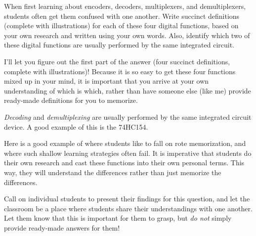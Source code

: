 

When first learning about encoders, decoders, multiplexers, and demultiplexers, students often get them confused with one another.  Write succinct definitions (complete with illustrations) for each of these four digital functions, based on your own research and written using your own words.  Also, identify which two of these digital functions are usually performed by the same integrated circuit.

\vskip 300pt







I'll let you figure out the first part of the answer (four succinct definitions, complete with illustrations)!  Because it is so easy to get these four functions mixed up in your mind, it is important that you arrive at your own understanding of which is which, rather than have someone else (like me) provide ready-made definitions for you to memorize.

\vskip 10pt

{\it Decoding} and {\it demultiplexing} are usually performed by the same integrated circuit device.  A good example of this is the 74HC154.







Here is a good example of where students like to fall on rote memorization, and where such shallow learning strategies often fail.  It is imperative that students do their own research and cast these functions into their own personal terms.  This way, they will understand the differences rather than just memorize the differences.

Call on individual students to present their findings for this question, and let the classroom be a place where students share their understandings with one another.  Let them know that this is important for them to grasp, but {\it do not} simply provide ready-made answers for them!




